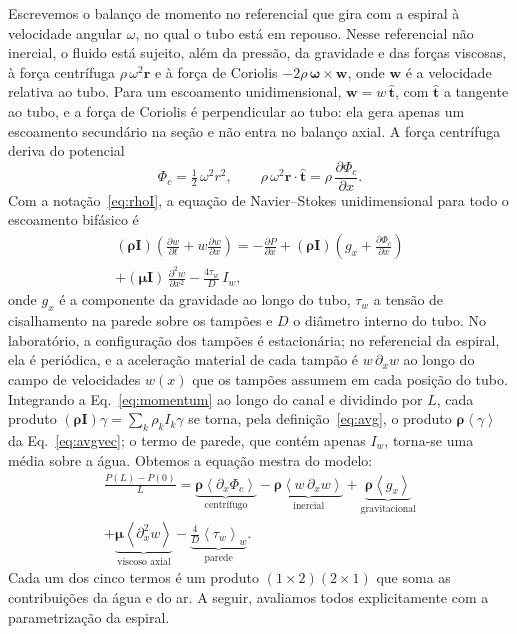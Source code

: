 \documentclass[aps,pre,twocolumn,superscriptaddress,nofootinbib,floatfix]{revtex4-2}
\newcommand{\avg}[1]{\left\langle #1 \right\rangle}
\begin{document}
Escrevemos o balanço de momento no referencial que gira com a espiral à velocidade angular $\omega$, no qual o tubo está em repouso. Nesse referencial não inercial, o fluido está sujeito, além da pressão, da gravidade e das forças viscosas, à força centrífuga $\rho\,\omega^2\bm r$ e à força de Coriolis $-2\rho\,\bm\omega\times\bm w$, onde $\bm w$ é a velocidade relativa ao tubo. Para um escoamento unidimensional, $\bm w=w\,\hat{\bm t}$, com $\hat{\bm t}$ a tangente ao tubo, e a força de Coriolis é perpendicular ao tubo: ela gera apenas um escoamento secundário na seção e não entra no balanço axial. A força centrífuga deriva do potencial
\begin{equation}
  \Phi_c = \tfrac12\,\omega^2r^2, \qquad \rho\,\omega^2\bm r\cdot\hat{\bm t} = \rho\,\frac{\partial\Phi_c}{\partial x}.
\end{equation}
Com a notação~\eqref{eq:rhoI}, a equação de Navier--Stokes unidimensional para todo o escoamento bifásico é
\begin{multline}
  (\bm\rho\mathbf I)\left(\frac{\partial w}{\partial t}+w\frac{\partial w}{\partial x}\right)
  = -\frac{\partial P}{\partial x}
  + (\bm\rho\mathbf I)\left(g_x+\frac{\partial\Phi_c}{\partial x}\right) \\
  + (\bm\mu\mathbf I)\,\frac{\partial^2w}{\partial x^2}
  - \frac{4\tau_w}{D}\,I_w ,
  \label{eq:momentum}
\end{multline}
onde $g_x$ é a componente da gravidade ao longo do tubo, $\tau_w$ a tensão de cisalhamento na parede sobre os tampões e $D$ o diâmetro interno do tubo. No laboratório, a configuração dos tampões é estacionária; no referencial da espiral, ela é periódica, e a aceleração material de cada tampão é $w\,\partial_xw$ ao longo do campo de velocidades $w(x)$ que os tampões assumem em cada posição do tubo. Integrando a Eq.~\eqref{eq:momentum} ao longo do canal e dividindo por $L$, cada produto $(\bm\rho\mathbf I)\gamma=\sum_k\rho_kI_k\gamma$ se torna, pela definição~\eqref{eq:avg}, o produto $\bm\rho\avg{\gamma}$ da Eq.~\eqref{eq:avgvec}; o termo de parede, que contém apenas $I_w$, torna-se uma média sobre a água. Obtemos a equação mestra do modelo:
\begin{multline}
  \frac{P(L)-P(0)}{L}
  = \underbrace{\bm\rho\avg{\partial_x\Phi_c}}_{\text{centrífugo}}
  - \underbrace{\bm\rho\avg{w\,\partial_xw}}_{\text{inercial}}
  + \underbrace{\bm\rho\avg{g_x}}_{\text{gravitacional}} \\
  + \underbrace{\bm\mu\avg{\partial_x^2w}}_{\text{viscoso axial}}
  - \underbrace{\frac{4}{D}\avg{\tau_w}_w}_{\text{parede}} .
  \label{eq:averaged}
\end{multline}
Cada um dos cinco termos é um produto $(1\times2)(2\times1)$ que soma as contribuições da água e do ar. A seguir, avaliamos todos explicitamente com a parametrização da espiral.
\end{document}
